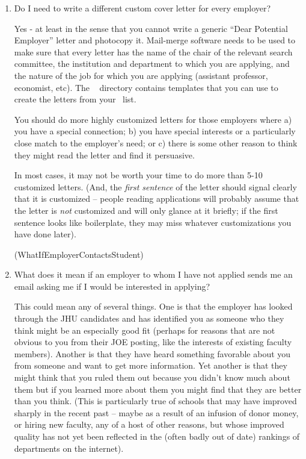 \documentclass{econtex}
\providecommand\phantomsection{}
\begin{document}
\begin{enumerate}
\item Do I need to write a different custom cover letter for every employer?
  
  Yes - at least in the sense that you cannot write a generic ``Dear Potential Employer'' letter
  and photocopy it.  Mail-merge software needs to be used to make sure
  that every letter has the name of the chair of the relevant search
  committee, the institution and department to which you are applying,
  and the nature of the job for which you are applying (assistant
  professor, economist, etc).  The \Templates~ directory contains templates that 
you can use to create the letters from your \EM~list.  
  
  You should do more highly customized letters for those employers
  where a) you have a special connection; b) you have special
  interests or a particularly close match to the employer's need; or
  c) there is some other reason to think they might read the letter
  and find it persuasive.  

  In most cases, it may not be worth your time to do more than
  5-10 customized letters.  (And, the {\it first sentence} of the letter should signal
clearly that it is customized -- people reading applications will probably assume that the letter is {\it not} customized and will only glance at it briefly; if the first sentence looks like boilerplate, they may miss whatever customizations you have done later).

\ifdvi\phantomsection\hypertarget{WhatIfEmployerContactsStudent}{(WhatIfEmployerContactsStudent)}\fi
\item What does it mean if an employer to whom I have not applied sends me an email asking me if I would be interested in applying?

This could mean any of several things.  One is that the employer has looked through the JHU candidates and 
has identified you as someone who they think might be an especially good fit (perhaps for reasons that are 
not obvious to you from their JOE posting, like the interests of existing faculty members).  Another is that they
have heard something favorable about you from someone and want to get more information.  Yet another is that they
might think that you ruled them out because you didn't know much about them but if you learned more about them 
you might find that they are better than you think.  (This is particularly true of schools that may have improved sharply 
in the recent past -- maybe as a result of an infusion of donor money, or hiring new faculty, any of a host of other reasons, but whose 
improved quality has not yet been reflected in the (often badly out of date) rankings of departments on the internet).


\end{enumerate}
\end{document}
